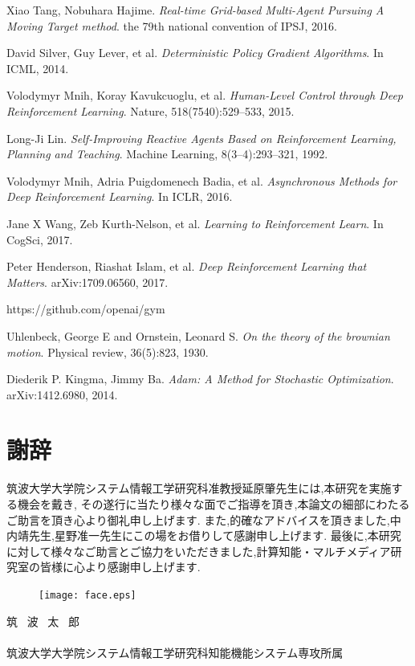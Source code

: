 \documentclass[11pt,twocolumn]{jarticle} %
\begin{document}
\begin{thebibliography}{9}
Xiao Tang, Nobuhara Hajime. \textsl{Real-time Grid-based Multi-Agent Pursuing A Moving Target method}. the 79th national convention of IPSJ, 2016. 

David Silver, Guy Lever, et al. \textsl{Deterministic Policy Gradient Algorithms}. In ICML, 2014.

Volodymyr Mnih, Koray Kavukcuoglu, et al. \textsl{Human-Level Control through Deep Reinforcement Learning}. Nature, 518(7540):529–533, 2015.

Long-Ji Lin. \textsl{Self-Improving Reactive Agents Based on Reinforcement Learning, Planning and Teaching}. Machine Learning, 8(3–4):293–321, 1992.

Volodymyr Mnih, Adria Puigdomenech Badia, et al. \textsl{Asynchronous Methods for Deep Reinforcement Learning}. In ICLR, 2016.

Jane X Wang, Zeb Kurth-Nelson, et al. \textsl{Learning to Reinforcement Learn}. In CogSci, 2017.

Peter Henderson, Riashat Islam, et al. \textsl{Deep Reinforcement Learning that Matters}. arXiv:1709.06560, 2017.

https://github.com/openai/gym

Uhlenbeck, George E and Ornstein, Leonard S. \textsl{On the theory of the brownian motion}. Physical
review, 36(5):823, 1930.

Diederik P. Kingma, Jimmy Ba. \textsl{Adam: A Method for Stochastic Optimization}. arXiv:1412.6980, 2014.

\section*{謝辞}
筑波大学大学院システム情報工学研究科准教授延原肇先生には,本研究を実施する機会を戴き,
その遂行に当たり様々な面でご指導を頂き,本論文の細部にわたるご助言を頂き心より御礼申し上げます.
また,的確なアドバイスを頂きました,中内靖先生,星野准一先生にこの場をお借りして感謝申し上げます.
最後に,本研究に対して様々なご助言とご協力をいただきました,計算知能・マルチメディア研究室の皆様に心より感謝申し上げます.
\vspace{2zh}
\begin{minipage}{73mm}
 \begin{figure} 
 \begin{center}
  \texttt{[image: face.eps]}
 \end{center}
 \end{figure}
 \noindent 筑 \ 波 \ 太 \  郎\\\\
 筑波大学大学院システム情報工学研究科知能機能システム専攻所属
\end{minipage}

\end{thebibliography}
\clearpage
\end{document}
